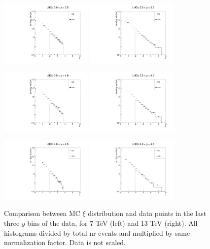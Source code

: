 \documentclass{article}
\begin{document}
\clearpage

\begin{figure}[h!]
\centering
\includegraphics[width = 0.4\textwidth]{plots/xi_LHCb_y3_7.pdf}
\includegraphics[width = 0.4\textwidth]{plots/xi_LHCb_y3_13.pdf}

\includegraphics[width = 0.4\textwidth]{plots/xi_LHCb_y4_7.pdf}
\includegraphics[width = 0.4\textwidth]{plots/xi_LHCb_y4_13.pdf}

\includegraphics[width = 0.4\textwidth]{plots/xi_LHCb_y5_7.pdf}
\includegraphics[width = 0.4\textwidth]{plots/xi_LHCb_y5_13.pdf}
\caption{Comparison between MC $\xi$ distribution and data points in the last three $y$ bins of the data, for 7 TeV (left) and 13 TeV (right). All histograms divided by total nr events and multiplied by same normalization factor. Data is not scaled.}\label{f:xi_comp_3}
\end{figure}
\end{document}
